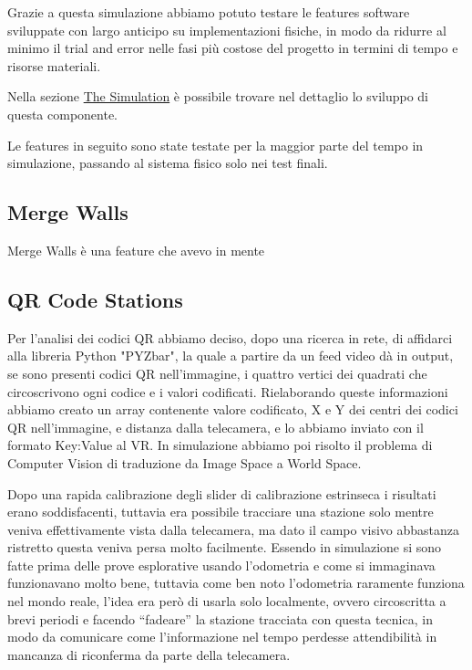 \documentclass{Configuration_Files/PoliMi3i_thesis}
\begin{document}
Grazie a questa simulazione abbiamo potuto testare le features software sviluppate con largo anticipo su implementazioni fisiche, in modo da ridurre al minimo il trial and error nelle fasi più costose del progetto in termini di tempo e risorse materiali.

Nella sezione \href{https://docs.google.com/document/d/1_oHQyfN3Rls1Onoe8GPsAkBPQEaSgN63hHX0KCW-OhU/edit\#heading=h.ugcex1ghxrlt}{The Simulation} è possibile trovare nel dettaglio lo sviluppo di questa componente.

Le features in seguito sono state testate per la maggior parte del tempo in simulazione, passando al sistema fisico solo nei test finali.

\subsection{Merge Walls}

Merge Walls è una feature che avevo in mente

\subsection{QR Code Stations}

Per l’analisi dei codici QR abbiamo deciso, dopo una ricerca in rete, di affidarci alla libreria Python "PYZbar", la quale a partire da un feed video dà in output, se sono presenti codici QR nell’immagine, i quattro vertici dei quadrati che circoscrivono ogni codice e i valori codificati. Rielaborando queste informazioni abbiamo creato un array contenente valore codificato, X e Y dei centri dei codici QR nell’immagine, e distanza dalla telecamera, e lo abbiamo inviato con il formato Key:Value al VR. In simulazione abbiamo poi risolto il problema di Computer Vision di traduzione da Image Space a World Space.

Dopo una rapida calibrazione degli slider di calibrazione estrinseca i risultati erano soddisfacenti, tuttavia era possibile tracciare una stazione solo mentre veniva effettivamente vista dalla telecamera, ma dato il campo visivo abbastanza ristretto questa veniva persa molto facilmente. Essendo in simulazione si sono fatte prima delle prove esplorative usando l’odometria e come si immaginava funzionavano molto bene, tuttavia come ben noto l’odometria raramente funziona nel mondo reale, l’idea era però di usarla solo localmente, ovvero circoscritta a brevi periodi e facendo “fadeare” la stazione tracciata con questa tecnica, in modo da comunicare come l’informazione nel tempo perdesse attendibilità in mancanza di riconferma da parte della telecamera.
\end{document}
